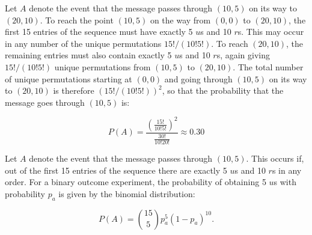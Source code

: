 \begin{problem}{11}  Let $A$ denote the event that the message passes through $(10, 5)$ on its way to $(20, 10)$. To reach the point $(10, 5)$ on the way from $(0, 0)$ to $(20, 10)$, the first 15 entries of the sequence must have exactly 5 $u$s and 10 $r$s.  This may occur in any number of the unique permutations $15!/(10! 5!)$.  To reach $(20, 10)$, the remaining entries must also contain exactly 5 $u$s and 10 $r$s, again giving $15!/(10! 5!)$ unique permutations from $(10, 5)$ to $(20, 10)$.  The total number of unique permutations starting at $(0, 0)$ and  going through $(10, 5)$ on its way to $(20, 10)$ is therefore $(15!/(10! 5!))^2$, so that the probability that the message goes through $(10, 5)$ is:

\begin{equation*}
P(A) = \frac{\left(\frac{15!}{10!5!}\right)^2}{\frac{30!}{10!20!}} \approx 0.30
\end{equation*}
 
\end{problem}

\begin{problem}{12}
Let $A$ denote the event that the message passes through $(10, 5)$.  This occurs if, out of the first 15 entries of the sequence there are exactly 5 $u$s and 10 $r$s in any order.  For a binary outcome experiment, the probability of obtaining 5 $u$s with probability $p_a$ is given by the binomial distribution:

\begin{equation*}
P(A) = \binom{15}{5} p_a^5(1-p_a)^{10}.
\end{equation*}

\end{problem}



